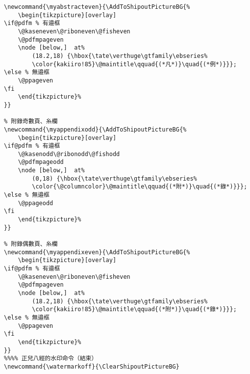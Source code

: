 \begin{lstlisting}[firstnumber=541]
% 凡例偶數頁、糸欄
\newcommand{\myabstracteven}{\AddToShipoutPictureBG{%
	\begin{tikzpicture}[overlay]
\if@pdfm % 有邉框
	\@kaseneven\@riboneven\@fisheven
	\@pdfmpageven
	\node [below,]  at%
		(18.2,18) {\hbox{\tate\verthuge\gtfamily\ebseries%
		\color{kakiiro!85}\@maintitle\qquad{(*凡*)}\quad{(*例*)}}};
\else % 無邉框
	\@ppageven
\fi
	\end{tikzpicture}%
}}

% 附錄奇數頁、糸欄
\newcommand{\myappendixodd}{\AddToShipoutPictureBG{%
	\begin{tikzpicture}[overlay]
\if@pdfm % 有邉框
	\@kasenodd\@ribonodd\@fishodd
	\@pdfmpageodd
	\node [below,]  at%
		(0,18) {\hbox{\tate\verthuge\gtfamily\ebseries%
		\color{\@columncolor}\@maintitle\qquad{(*附*)}\quad{(*錄*)}}};
\else % 無邉框
	\@ppageodd
\fi
	\end{tikzpicture}%
}}

% 附錄偶數頁、糸欄
\newcommand{\myappendixeven}{\AddToShipoutPictureBG{%
	\begin{tikzpicture}[overlay]
\if@pdfm % 有邉框
	\@kaseneven\@riboneven\@fisheven
	\@pdfmpageven
	\node [below,]  at%
		(18.2,18) {\hbox{\tate\verthuge\gtfamily\ebseries%
		\color{kakiiro!85}\@maintitle\qquad{(*附*)}\quad{(*錄*)}}};
\else % 無邉框
	\@ppageven
\fi
	\end{tikzpicture}%
}}
%%%% 正兒八經的水印命令（結束）
\newcommand{\watermarkoff}{\ClearShipoutPictureBG}

\end{lstlisting}

